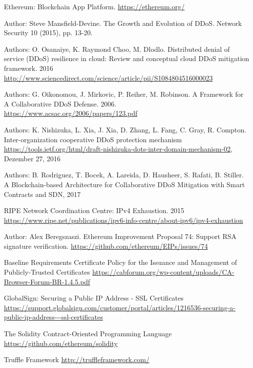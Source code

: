 \begin{thebibliography}{99}

 Ethereum: Blockchain App Platform. \url{https://ethereum.org/}

 Author: Steve Mansfield-Devine. The Growth and Evolution of DDoS. Network
Security 10 (2015), pp. 13-20.

 Authors: O. Osanaiye, K. Raymond Choo, M. Dlodlo. Distributed denial of service (DDoS) resilience in cloud: Review and conceptual cloud DDoS mitigation framework. 2016 \url{http://www.sciencedirect.com/science/article/pii/S1084804516000023}

 Authors: G. Oikonomou, J. Mirkovic, P. Reiher, M. Robinson. A Framework for A Collaborative DDoS Defense. 2006. \url{https://www.acsac.org/2006/papers/123.pdf}

Authors: K. Nishizuka, L. Xia, J. Xia, D. Zhang, L. Fang, C. Gray, R. Compton. Inter-organization cooperative DDoS protection mechanism \url{https://tools.ietf.org/html/draft-nishizuka-dots-inter-domain-mechanism-02}, Dezember 27, 2016

 Authors: B. Rodriguez, T. Bocek, A. Lareida, D. Hausheer, S. Rafati, B. Stiller. A Blockchain-based Architecture for Collaborative DDoS Mitigation with Smart Contracts and SDN, 2017

 RIPE Network Coordination Centre: IPv4 Exhaustion. 2015 \url{https://www.ripe.net/publications/ipv6-info-centre/about-ipv6/ipv4-exhaustion}

 Author: Alex Beregszaszi. Ethereum Improvement Proposal 74: Support RSA signature verification. \url{https://github.com/ethereum/EIPs/issues/74}

 Baseline Requirements Certificate Policy for the Issuance and Management of Publicly-Trusted Certificates \url{https://cabforum.org/wp-content/uploads/CA-Browser-Forum-BR-1.4.5.pdf}

 GlobalSign: Securing a Public IP Address - SSL Certificates
\url{https://support.globalsign.com/customer/portal/articles/1216536-securing-a-public-ip-address---ssl-certificates}

 The Solidity Contract-Oriented Programming Language
\url{https://github.com/ethereum/solidity}


 Truffle Framework \url{http://truffleframework.com/}


\end{thebibliography}
